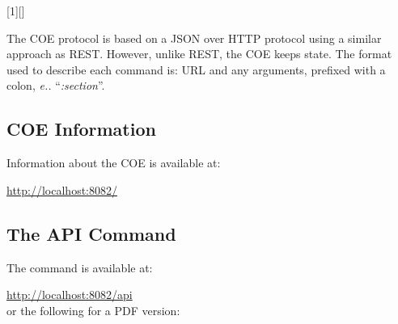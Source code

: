 %
%
%
%
%




[1][]{\lstset{language=json}\lstset{#1}}
{}
\newcommand{\mparagraph}[1]{\paragraph{#1}\mbox{}\\}

The COE protocol is based on a JSON over HTTP protocol using a similar approach as REST.
%
However, unlike REST, the COE keeps state. The format used to describe each command is: URL and any arguments, prefixed with a colon, \emph{e.\@g.\@} ``\textit{:section}''.
%
%
%
\subsection{COE Information}
Information about the COE is available at:

\url{http://localhost:8082/}
%
%
%
\subsection{The API Command}

The command is available at:

\url{http://localhost:8082/api}\\

\noindent or the following for a PDF version:

